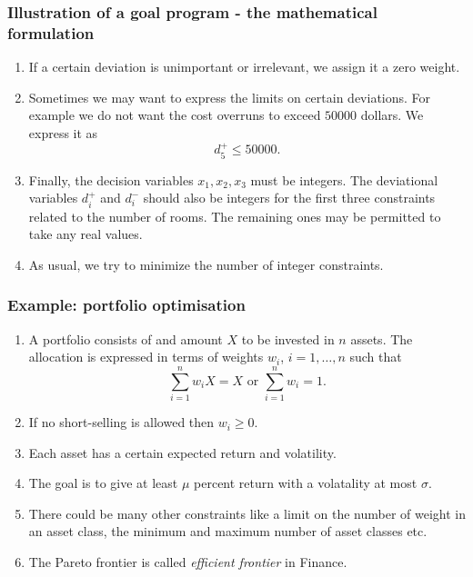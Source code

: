 \documentclass{beamer}
\begin{document}
\begin{frame}
\frametitle{Illustration of a goal program - the mathematical formulation}
\begin{enumerate}
\item If a certain deviation is unimportant or irrelevant, we assign it a
zero weight.
\item Sometimes we may want to express the limits on certain deviations. For 
example we do not want the cost overruns to exceed $50000$ dollars. We express 
it as
\begin{equation}\label{e15}
d_5^+ \le 50000.
\end{equation}
\item Finally, the decision variables $x_1, x_2, x_3$ must be integers. The
deviational variables $d_i^+$ and $d_i^-$ should also be integers for the
first three constraints related to the number of rooms. The remaining ones may
be permitted to take any real values.
\item As usual, we try to minimize the number of integer constraints.
\end{enumerate}
\end{frame}

\begin{frame}
\frametitle{Example: portfolio optimisation}
\begin{enumerate}
\item A portfolio consists of and amount $X$ to be invested in $n$ assets. The
allocation is expressed in terms of weights $w_i$, $i = 1, \ldots, n$ such that
\begin{equation}\label{e16}
\sum_{i=1}^n w_iX = X \text{ or } \sum_{i=1}^n w_i = 1.
\end{equation}
\item If no short-selling is allowed then $w_i \ge 0$.
\item Each asset has a certain expected return and volatility.
\item The goal is to give at least $\mu$ percent return with a volatality at
most $\sigma$. 
\item There could be many other constraints like a limit on the number of weight
in an asset class, the minimum and maximum number of asset classes etc.
\item The Pareto frontier is called \emph{efficient frontier} in Finance.
\end{enumerate}
\end{frame}
\end{document}
